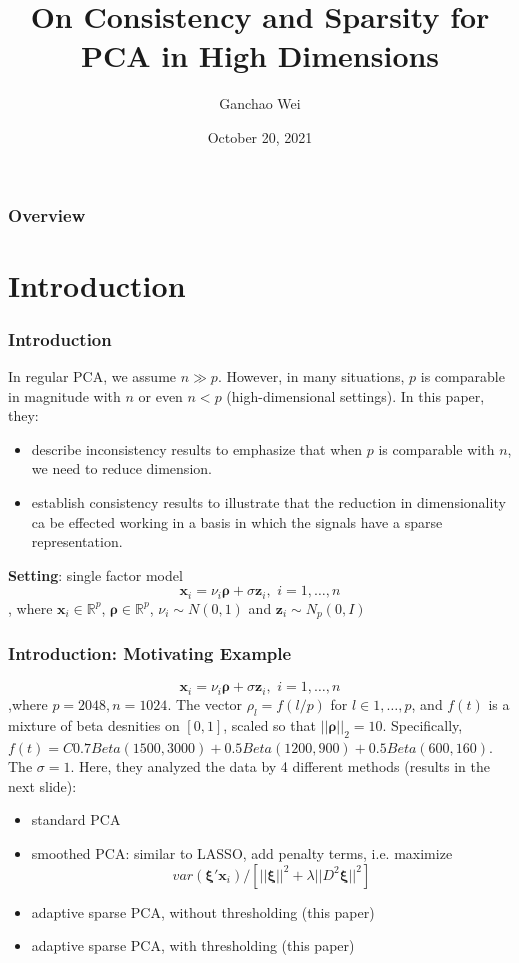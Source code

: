 \documentclass{beamer}
\title[ASPCA]{On Consistency and Sparsity for PCA in High Dimensions}
\author{Ganchao Wei}
\date{October 20, 2021}
\begin{document}
	
	\begin{frame}
		\titlepage %
	\end{frame}
	
	\begin{frame}
		\frametitle{Overview} %
		\tableofcontents
	\end{frame}
	
	
	\section{Introduction}
	
	\begin{frame}
		\frametitle{Introduction}
		In regular PCA, we assume $n \gg p$. However, in many situations, $p$ is comparable in magnitude with $n$ or even $n < p$ (high-dimensional settings). In this paper, they:
		\begin{itemize}
			\item
			describe inconsistency results to emphasize that when $p$ is comparable with $n$, we need to reduce dimension.
			\item
			establish consistency results to illustrate that the reduction in dimensionality ca be effected working in a basis in which the signals have a sparse representation.
		\end{itemize}
		\textbf{Setting}: single factor model
		$$\bm{x}_i=\nu_i\bm{\rho} + \sigma\bm{z}_i,\,\, i=1,\ldots,n$$
		, where $\bm{x}_i \in \mathbb{R}^p$,  $\bm{\rho} \in \mathbb{R}^p$, $\nu_i\sim N(0,1)$ and $\bm{z}_i\sim N_p(0,I)$
	\end{frame}
	
	\begin{frame}
		\frametitle{Introduction: Motivating Example}
		$$\bm{x}_i=\nu_i\bm{\rho} + \sigma\bm{z}_i,\,\, i=1,\ldots,n$$
		,where $p=2048, n= 1024$. The vector $\rho_l=f(l/p)$ for $l\in {1,\ldots,p}$, and $f(t)$ is a mixture of beta desnities on $[0,1]$, scaled so that $||\bm{\rho}||_2 = 10$. Specifically, $f(t) = C{0.7Beta(1500,3000) + 0.5Beta(1200,900) + 0.5Beta(600,160)}$. The $\sigma=1$. Here, they analyzed the data by 4 different methods (results in the next slide):
		\begin{itemize}
			\item
			standard PCA
			\item
			smoothed PCA: similar to LASSO, add penalty terms, i.e. maximize
			$$var(\bm{\xi}'\bm{x}_i)/[||\bm{\xi}||^2 + \lambda ||D^2\bm{\xi}||^2]$$
			\item
			adaptive sparse PCA, without thresholding (this paper)
			\item
			adaptive sparse PCA, with thresholding (this paper)
		\end{itemize} 
	\end{frame}
	
\end{document}

